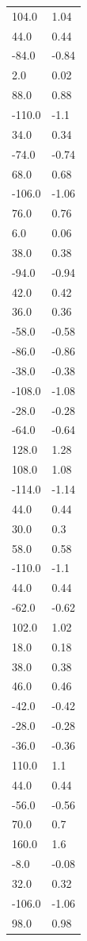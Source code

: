 \begin{longtable}{ll}
104.0 & 1.04 \\
44.0 & 0.44 \\
-84.0 & -0.84 \\
2.0 & 0.02 \\
88.0 & 0.88 \\
-110.0 & -1.1 \\
34.0 & 0.34 \\
-74.0 & -0.74 \\
68.0 & 0.68 \\
-106.0 & -1.06 \\
76.0 & 0.76 \\
6.0 & 0.06 \\
38.0 & 0.38 \\
-94.0 & -0.94 \\
42.0 & 0.42 \\
36.0 & 0.36 \\
-58.0 & -0.58 \\
-86.0 & -0.86 \\
-38.0 & -0.38 \\
-108.0 & -1.08 \\
-28.0 & -0.28 \\
-64.0 & -0.64 \\
128.0 & 1.28 \\
108.0 & 1.08 \\
-114.0 & -1.14 \\
44.0 & 0.44 \\
30.0 & 0.3 \\
58.0 & 0.58 \\
-110.0 & -1.1 \\
44.0 & 0.44 \\
-62.0 & -0.62 \\
102.0 & 1.02 \\
18.0 & 0.18 \\
38.0 & 0.38 \\
46.0 & 0.46 \\
-42.0 & -0.42 \\
-28.0 & -0.28 \\
-36.0 & -0.36 \\
110.0 & 1.1 \\
44.0 & 0.44 \\
-56.0 & -0.56 \\
70.0 & 0.7 \\
160.0 & 1.6 \\
-8.0 & -0.08 \\
32.0 & 0.32 \\
-106.0 & -1.06 \\
98.0 & 0.98 \\

\end{longtable}
